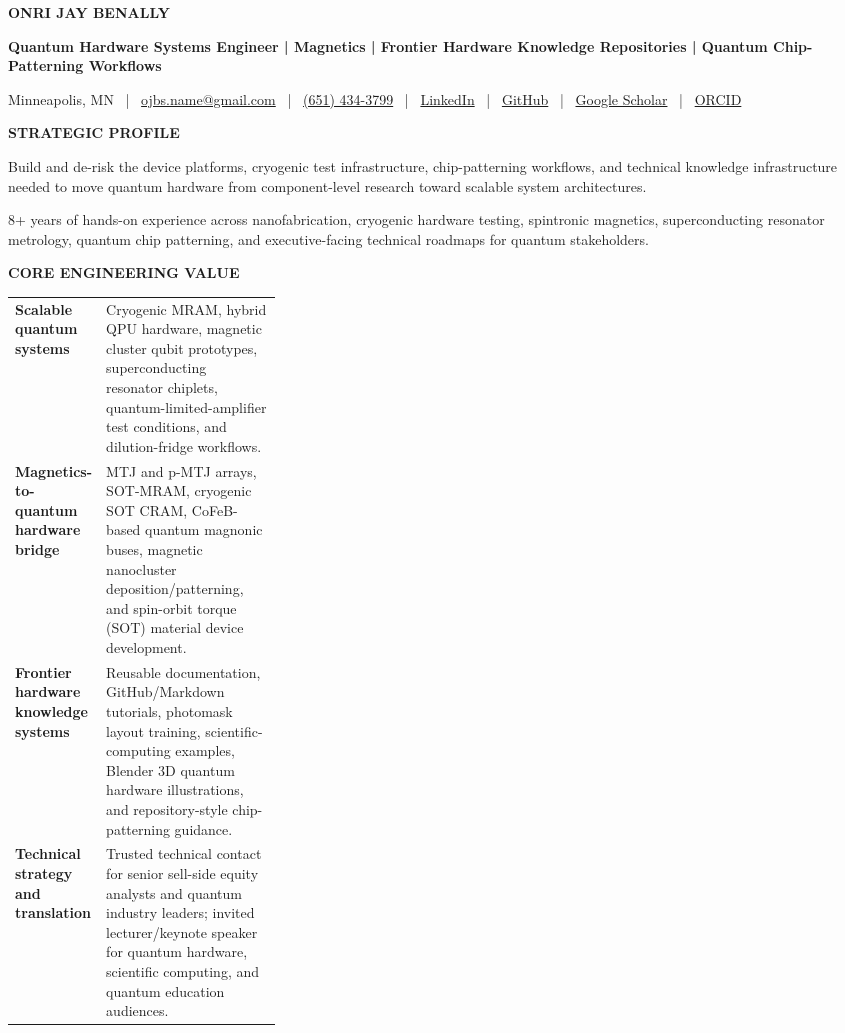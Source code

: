 \documentclass[10pt,letterpaper]{article}
\newcommand{\name}[1]{%
  {\fontsize{24}{26}\selectfont\bfseries\color{PureBlue} #1}\par
}
\newcommand{\roleline}[1]{%
  {\fontsize{10.5}{12}\selectfont\bfseries #1}\par
}
\newcommand{\sectionheading}[1]{%
  \vspace{4pt}%
  {\fontsize{9.5}{10.5}\selectfont\bfseries\color{PureBlue}\MakeUppercase{#1}}\par
  \vspace{-6pt}{\color{PureBlue}\rule{\linewidth}{0.45pt}}\vspace{1pt}
}
\begin{document}
\name{ONRI JAY BENALLY}
\roleline{Quantum Hardware Systems Engineer \textmd{| Magnetics | Frontier Hardware Knowledge Repositories | Quantum Chip-Patterning Workflows}}
{\fontsize{8.7}{10}\selectfont
Minneapolis, MN \ | \ \href{mailto:ojbs.name@gmail.com}{ojbs.name@gmail.com} \ | \ \href{tel:+16514343799}{(651) 434-3799} \ | \ \href{https://tinyurl.com/OJB-LinkedIn}{LinkedIn} \ | \ \href{https://github.com/OJB-Quantum}{GitHub} \ | \ \href{https://z.umn.edu/OJB-Google-Scholar}{Google Scholar} \ | \ \href{https://orcid.org/0000-0002-8391-9105}{ORCID}
}

\sectionheading{Strategic Profile}
\fontsize{8.9}{10.15}\selectfont
Build and de-risk the device platforms, cryogenic test infrastructure, chip-patterning workflows, and technical knowledge infrastructure needed to move quantum hardware from
component-level research toward scalable system architectures.

8+ years of hands-on experience across nanofabrication, cryogenic hardware testing, spintronic magnetics, superconducting resonator metrology, quantum chip patterning, and executive-facing technical roadmaps for quantum stakeholders.

\sectionheading{Core Engineering Value}
\begin{tabularx}{\linewidth}{@{}p{0.31\linewidth}Y@{}}
\textbf{Scalable quantum systems} & Cryogenic MRAM, hybrid QPU hardware, magnetic cluster qubit prototypes, superconducting resonator chiplets, quantum-limited-amplifier test conditions, and dilution-fridge workflows. \\
\textbf{Magnetics-to-quantum hardware bridge} & MTJ and p-MTJ arrays, SOT-MRAM, cryogenic SOT CRAM, CoFeB-based quantum magnonic buses, magnetic nanocluster deposition/patterning, and spin-orbit torque (SOT) material device development. \\
\textbf{Frontier hardware knowledge systems} & Reusable documentation, GitHub/Markdown tutorials, photomask layout training, scientific-computing examples, Blender 3D quantum hardware illustrations, and repository-style chip-patterning guidance. \\
\textbf{Technical strategy and translation} & Trusted technical contact for senior sell-side equity analysts and quantum industry leaders; invited lecturer/keynote speaker for quantum hardware, scientific computing, and quantum education audiences. \\
\end{tabularx}
\end{document}
